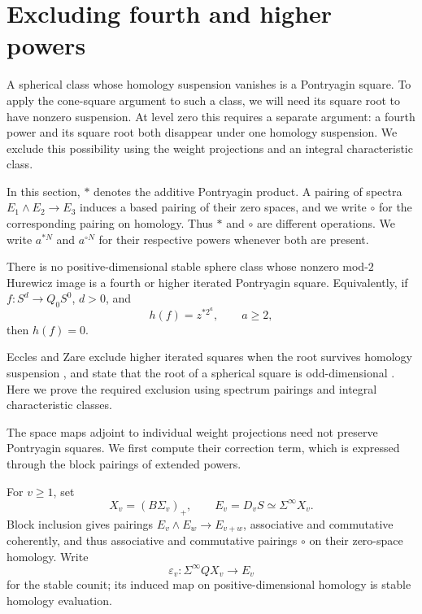 \section{Excluding fourth and higher powers}
\label{sec:powers}

A spherical class whose homology suspension vanishes is a Pontryagin
square.  To apply the cone-square argument to such a class, we will need
its square root to have nonzero suspension.  At level zero this requires
a separate argument: a fourth power and its square root both disappear
under one homology suspension.  We exclude this possibility using the
weight projections and an integral characteristic class.

In this section, $*$ denotes the additive Pontryagin product.  A pairing
of spectra $E_1\wedge E_2\to E_3$ induces a based pairing of their zero
spaces, and we write $\circ$ for the corresponding pairing on homology.
Thus $*$ and $\circ$ are different operations.  We write $a^{*N}$ and
$a^{\circ N}$ for their respective powers whenever both are present.

\begin{proposition}
\label{prop:no-fourth-powers}
There is no positive-dimensional stable sphere class whose nonzero
mod-$2$ Hurewicz image is a fourth or higher iterated Pontryagin
square.  Equivalently, if $f:S^d\to Q_0S^0$, $d>0$, and
\[
 h(f)=z^{*2^a},\qquad a\geq2,
\]
then $h(f)=0$.
\end{proposition}

Eccles and Zare exclude higher iterated squares when the root survives
homology suspension \cite[Theorem~3.10]{EcclesZare2009}, and state that
the root of a spherical square is odd-dimensional
\cite[Lemma~3.12]{EcclesZare2009}. Here we prove the required exclusion
using spectrum pairings and integral characteristic classes.

The space maps adjoint to individual weight projections need not
preserve Pontryagin squares. We first compute their correction term,
which is expressed through the block pairings of extended powers.

For $v\geq1$, set
\[
 X_v=(B\Sigma_v)_+,\qquad E_v=D_vS\simeq\Sigma^\infty X_v.
\]
Block inclusion gives pairings $E_v\wedge E_w\to E_{v+w}$, associative
and commutative coherently, and thus associative and commutative
pairings $\circ$ on their zero-space homology.  Write
\[
 \varepsilon_v:\Sigma^\infty QX_v\longrightarrow E_v
\]
for the stable counit; its induced map on positive-dimensional homology
is stable homology evaluation.

